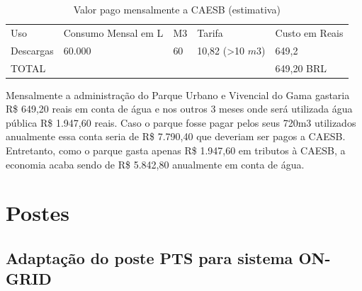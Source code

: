 \begin{table}[h]
\centering
\caption{Valor pago mensalmente a CAESB (estimativa)}
\label{Valor pago mensalmente a CAESB (estimativa)}
\begin{tabular}{lllll}
 &  &  &  &  \\ \hline
\multicolumn{1}{|l|}{Uso} & \multicolumn{1}{l|}{Consumo Mensal em L} & \multicolumn{1}{l|}{M3} & \multicolumn{1}{l|}{Tarifa} & \multicolumn{1}{l|}{Custo em Reais} \\ \hline
\multicolumn{1}{|l|}{Descargas} & \multicolumn{1}{l|}{60.000} & \multicolumn{1}{l|}{60} & \multicolumn{1}{l|}{10,82 (\textgreater10 $m{3}$)} & \multicolumn{1}{l|}{649,2} \\ \hline
\multicolumn{1}{|l|}{TOTAL} & \multicolumn{1}{l|}{} & \multicolumn{1}{l|}{} & \multicolumn{1}{l|}{} & \multicolumn{1}{l|}{649,20 BRL} \\ \hline
\end{tabular}
\end{table}

Mensalmente a administração do Parque Urbano e Vivencial do Gama gastaria R\$ 649,20 reais em conta de água e nos outros 3 meses onde será utilizada água pública R\$ 1.947,60 reais. Caso o parque fosse pagar pelos seus 720m3 utilizados anualmente essa conta seria de R\$ 7.790,40 que deveriam ser pagos a CAESB. Entretanto, como o parque gasta apenas R\$ 1.947,60 em tributos à CAESB, a economia acaba sendo de R\$ 5.842,80 anualmente em conta de água. 

\chapter{Postes}

\section{Adapta\c{c}\~ao do poste PTS para sistema ON-GRID}


